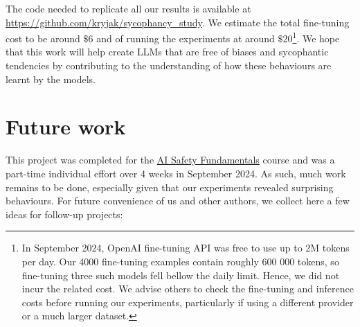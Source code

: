 \documentclass[12pt,onecolumn]{article}
\begin{document}
The code needed to replicate all our results is available at \url{https://github.com/kryjak/sycophancy_study}. We estimate the total fine-tuning cost to be around $\$6$ and of running the experiments at around $\$20$\footnote{In September 2024, OpenAI fine-tuning API was free to use up to 2M tokens per day. Our 4000 fine-tuning examples contain roughly 600 000 tokens, so fine-tuning three such models fell bellow the daily limit. Hence, we did not incur the related cost. We advise others to check the fine-tuning and inference costs before running our experiments, particularly if using a different provider or a much larger dataset.}. We hope that this work will help create LLMs that are free of biases and sycophantic tendencies by contributing to the understanding of how these behaviours are learnt by the models.

\section{Future work} \label{sec:future_work}
This project was completed for the \href{https://aisafetyfundamentals.com/alignment/}{AI Safety Fundamentals} course and was a part-time individual effort over 4 weeks in September 2024. As such, much work remains to be done, especially given that our experiments revealed surprising behaviours. For future convenience of us and other authors, we collect here a few ideas for follow-up projects:
\end{document}
